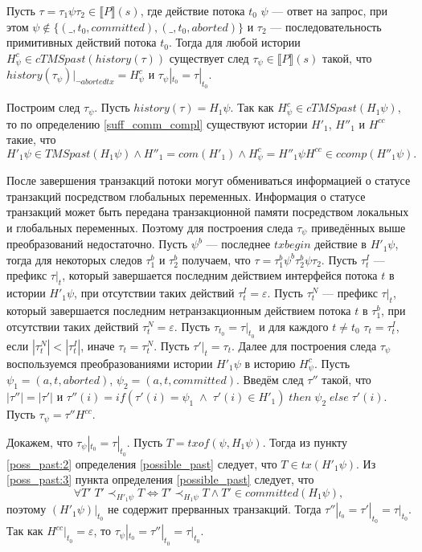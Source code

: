 \begin{lemma}\label{sufficiency1}
Пусть $\tau = \tau_1\psi\tau_2 \in \llbracket P \rrbracket (s)$, где действие потока $t_0$ $\psi$ --- ответ на запрос, при этом $\psi \notin \{(\_, t_0, committed),(\_,t_0, aborted)\}$ и $\tau_2$ --- последовательность примитивных действий потока $t_0$. Тогда для любой истории $H^c_{\psi} \in cTMSpast(history(\tau))$ существует след $\tau_{\psi} \in \llbracket P \rrbracket (s)$ такой, что $history(\tau_{\psi})|_{\neg abortedtx} = H^c_{\psi}$ и $\tau_{\psi}|_{t_0} = \tau|_{t_0}$. 
\end{lemma}
\begin{myproof}
Построим след $\tau_{\psi}$. Пусть $history(\tau) = H_1\psi$. Так как $H^c_{\psi} \in cTMSpast(H_1\psi)$, то по определению \ref{suff_comm_compl} существуют истории $H'_1$, $H''_1$ и $H^{cc}$ такие, что $$H'_1\psi \in TMSpast(H_1\psi) \land H''_1 = com(H'_1) \land H^c_{\psi} = H''_1{\psi}H^{cc} \in ccomp(H''_1\psi).$$

После завершения транзакций потоки могут обмениваться информацией о статусе транзакций посредством глобальных переменных. Информация о статусе транзакций может быть передана транзакционной памяти посредством локальных и глобальных переменных. Поэтому для построения следа $\tau_{\psi}$ приведённых выше преобразований недостаточно. Пусть $\psi^b$ --- последнее $txbegin$ действие в $H'_1\psi$, тогда для некоторых следов $\tau^b_1$ и $\tau^b_2$ получаем, что $\tau = \tau^b_1\psi^b\tau^b_2\psi\tau_2$. Пусть $\tau^I_t$ --- префикс $\tau|_t$, который завершается последним действием интерфейся потока $t$ в истории $H'_1\psi$, при отсутствии таких действий $\tau^I_t = \varepsilon$. Пусть $\tau^N_t$ --- префикс $\tau|_t$, который завершается последним нетранзакционным действием потока $t$ в $\tau^b_1$, при отсутствии таких действий $\tau^N_t = \varepsilon$. Пусть $\tau_{t_0} = \tau|_{t_0}$ и для каждого $t \neq t_0$ $\tau_t = \tau^I_t$, если $|\tau^N_t| < |\tau^I_t|$, иначе $\tau_t = \tau^N_t$. Пусть $\tau'|_t = \tau_t$. Далее для построения следа $\tau_{\psi}$ воспользуемся преобразованиями истории $H'_1\psi$ в историю $H^c_{\psi}$. Пусть $\psi_1 = (a, t, aborted)$, $\psi_2 = (a, t, committed)$. Введём след $\tau''$ такой, что $|\tau''| = |\tau'|$ и $ \tau''(i) = if \left (\tau'(i) = \psi_1 \; \land \; \tau'(i) \in H'_1 \right) \; then \; \psi_2 \; else \; \tau'(i).$ Пусть $\tau_{\psi} = \tau''H^{cc}$.

Докажем, что $\tau_{\psi}|_{t_0} = \tau|_{t_0}$. Пусть $T = txof(\psi, H_1\psi)$. Тогда из пункту \ref{poss_past:2} определения \ref{possible_past} следует, что $T \in tx(H'_1\psi)$. Из \ref{poss_past:3} пункта определения \ref{possible_past} следует, что \begin{equation}\label{eq:transform4iii}
\forall T' \; T' \prec_{H'_1\psi} T \iff T' \prec_{H_1\psi} T \land T' \in committed(H_1\psi),
\end{equation}
поэтому $(H'_1\psi)|_{t_0}$ не содержит прерванных транзакций. Тогда $\tau''|_{t_0} = \tau'|_{t_0} = \tau|_{t_0}$. Так как $H^{cc}|_{t_0} = \varepsilon$, то $\tau_{\psi}|_{t_0} = \tau''|_{t_0} = \tau|_{t_0}.$


\end{myproof}
